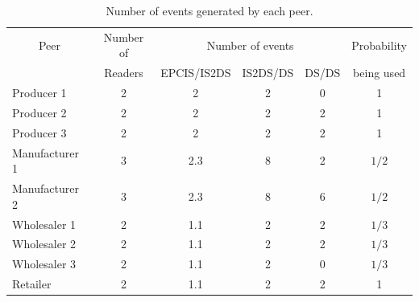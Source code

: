 \documentclass[a4paper]{llncs}
\begin{document}
\begin{table}
\caption{Number of events generated by each peer.}
\begin{center}
\begin{tabular}{|l|c|c|c|c|c|}
 \hline
 \multicolumn{1}{|c|}{Peer} & Number of & \multicolumn{3}{c|}{Number of events}  & Probability \\
 \cline{3-5}
          & Readers & EPCIS/IS2DS & IS2DS/DS & DS/DS  & being used\\
 \hline\hline
 Producer 1 & 2 & 2 & 2 & 0  & 1 \\
 Producer 2 & 2 & 2 & 2 & 2 & 1 \\
 Producer 3 & 2 & 2 & 2 & 2 & 1 \\
 \hline
 Manufacturer 1 & 3 & 2.3 & 8 & 2 & $1/2$ \\
 Manufacturer 2 & 3 & 2.3 & 8 & 6 & $1/2$ \\
 \hline
 Wholesaler 1 & 2 & 1.1 & 2 & 2 & $1/3$ \\
 Wholesaler 2 & 2 & 1.1 & 2 & 2 & $1/3$ \\
 Wholesaler 3 & 2 & 1.1 & 2 & 0 & $1/3$ \\
 \hline
 Retailer & 2 & 1.1 & 2 & 2  & 1 \\
 \hline
\end{tabular}
\label{tab:nbEvents}
\end{center}
\end{table}
\end{document}
